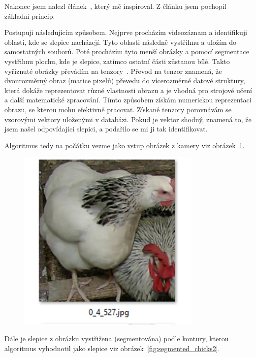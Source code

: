 Nakonec jsem nalezl článek~\cite{medium-person-reidentification}, který mě inspiroval. Z článku jsem pochopil základní princip.

Postupuji následujícím způsobem.
Nejprve procházím videozáznam a identifikuji oblasti, kde se slepice nacházejí.
Tyto oblasti následně vystřihnu a uložím do samostatných souborů.
Poté procházím tyto menší obrázky a pomocí segmentace vystřihnu plochu, kde je slepice, zatímco ostatní části zůstanou bílé.
Takto vyříznuté obrázky převádím na tenzory~\cite{Tenzor}.
Převod na tenzor znamená, že dvourozměrný obraz (matice pixelů) převedu do vícerozměrné datové struktury, která dokáže reprezentovat různé vlastnosti obrazu a je vhodná pro strojové učení a další matematické zpracování.
Tímto způsobem získám numerickou reprezentaci obrazu, se kterou mohu efektivně pracovat.
Získané tenzory porovnávám se vzorovými vektory uloženými v databázi.
Pokud je vektor shodný, znamená to, že jsem našel odpovídající slepici, a podařilo se mi ji tak identifikovat.

Algoritmus tedy na počátku vezme jako vstup obrázek z kamery viz obrázek~\ref{fig:source_chick_image}.

\begin{figure}[H]
    \centering
    \includegraphics[width=0.8\textwidth]{img/source_chick_image}
    \label{fig:source_chick_image}
\end{figure}

Dále je slepice z obrázku vystřižena (segmentována) podle kontury, kterou algoritmus vyhodnotil jako slepice viz obrázek~\ref{fig:segmented_chicks2}.

